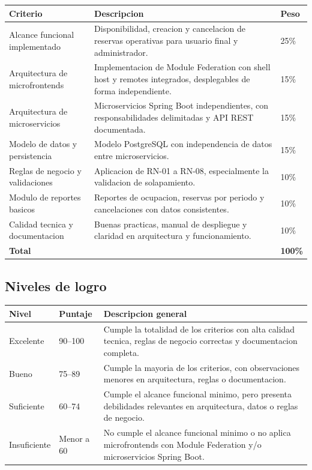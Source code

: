 \documentclass[12pt,a4paper]{article}
\begin{document}
\begin{longtable}{p{4.2cm}p{7.5cm}p{2cm}}
\textbf{Criterio} & \textbf{Descripcion} & \textbf{Peso} \\
\hline
Alcance funcional implementado & Disponibilidad, creacion y cancelacion de reservas operativas para usuario final y administrador. & 25\% \\
Arquitectura de microfrontends & Implementacion de Module Federation con shell host y remotes integrados, desplegables de forma independiente. & 15\% \\
Arquitectura de microservicios & Microservicios Spring Boot independientes, con responsabilidades delimitadas y API REST documentada. & 15\% \\
Modelo de datos y persistencia & Modelo PostgreSQL con independencia de datos entre microservicios. & 15\% \\
Reglas de negocio y validaciones & Aplicacion de RN-01 a RN-08, especialmente la validacion de solapamiento. & 10\% \\
Modulo de reportes basicos & Reportes de ocupacion, reservas por periodo y cancelaciones con datos consistentes. & 10\% \\
Calidad tecnica y documentacion & Buenas practicas, manual de despliegue y claridad en arquitectura y funcionamiento. & 10\% \\
\textbf{Total} & & \textbf{100\%} \\
\end{longtable}

\subsection{Niveles de logro}

\begin{longtable}{p{3cm}p{2.5cm}p{8.5cm}}
\textbf{Nivel} & \textbf{Puntaje} & \textbf{Descripcion general} \\
\hline
Excelente & 90--100 & Cumple la totalidad de los criterios con alta calidad tecnica, reglas de negocio correctas y documentacion completa. \\
Bueno & 75--89 & Cumple la mayoria de los criterios, con observaciones menores en arquitectura, reglas o documentacion. \\
Suficiente & 60--74 & Cumple el alcance funcional minimo, pero presenta debilidades relevantes en arquitectura, datos o reglas de negocio. \\
Insuficiente & Menor a 60 & No cumple el alcance funcional minimo o no aplica microfrontends con Module Federation y/o microservicios Spring Boot. \\
\end{longtable}
\end{document}
